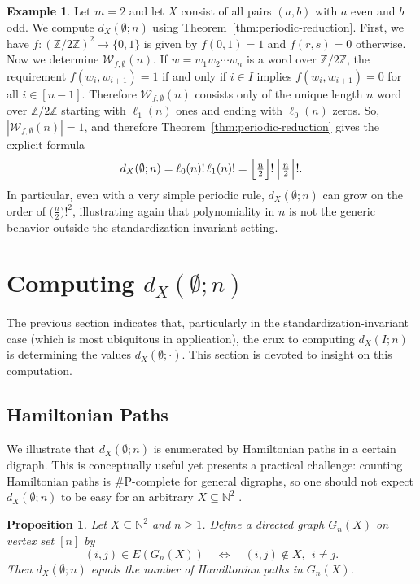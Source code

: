 \documentclass[12pt]{amsart}
\newtheorem{proposition}[theorem]{Proposition}
\theoremstyle{definition}
\newtheorem{example}[theorem]{Example}
\theoremstyle{remark}
\newcommand{\N}{\mathbb{N}}
\newcommand{\abs}[1]{\left|#1\right|}
\begin{document}
\begin{example} Let $m=2$ and let $X$ consist of all pairs $(a,b)$ with $a$ even and $b$ odd. We compute $d_X(\emptyset;n)$ using Theorem~\ref{thm:periodic-reduction}. First, we have $f:(\mathbb{Z}/2\mathbb{Z})^2 \to \{0,1\}$ is given by $f(0,1)=1$ and $f(r,s)=0$ otherwise. Now we determine $\mathcal{W}_{f,\emptyset}(n)$. If $w=w_1w_2 \cdots w_n$ is a word over $\mathbb{Z}/2\mathbb{Z}$, the requirement $f(w_i,w_{i+1})=1$ if and only if $i \in I$ implies $f(w_i,w_{i+1})=0$ for all $i \in [n-1]$. Therefore $\mathcal{W}_{f,\emptyset}(n)$ consists only of the unique length $n$ word over $\mathbb{Z}/2\mathbb{Z}$ starting with $\ell_1(n)$ ones and ending with $\ell_0(n)$ zeros. So, $\abs{\mathcal{W}_{f,\emptyset}(n)}=1$, and therefore Theorem~\ref{thm:periodic-reduction} gives the explicit formula
\[
d_X(\emptyset;n)=\ell_0(n)!\,\ell_1(n)! = \Bigl\lfloor\tfrac{n}{2}\Bigr\rfloor!\,\Bigl\lceil\tfrac{n}{2}\Bigr\rceil!.
\]
In particular, even with a very simple periodic rule, $d_X(\emptyset;n)$ can grow on the order of
$\bigl(\tfrac{n}{2}\bigr)!^2$, illustrating again that polynomiality in $n$ is not the generic behavior outside the
standardization-invariant setting.
\end{example}


\section{Computing $d_X(\emptyset;n)$}\label{sec:compute}

The previous section indicates that, particularly in the standardization-invariant case (which is most ubiquitous in application), the crux to computing $d_X(I;n)$ is determining the values $d_X(\emptyset;\cdot)$. This section is devoted to insight on this computation.

\subsection{Hamiltonian Paths}\label{sec:hamps}
%

 We illustrate that $d_X(\emptyset;n)$ is enumerated by Hamiltonian paths in a certain digraph. This is conceptually useful yet presents a practical challenge: counting Hamiltonian paths is \#P-complete for general digraphs, so one should not expect $d_X(\emptyset;n)$
to be easy for an arbitrary $X \subseteq \mathbb{N}^2$ \cite{garey-johnson,bang-jensen-gutin-digraphs}.

\begin{proposition}\label{prop:recursion}
Let $X\subseteq\N^2$ and $n\ge 1$. Define a directed graph $G_n(X)$ on vertex set $[n]$ by
\[
(i,j)\in E(G_n(X))\quad\Longleftrightarrow\quad (i,j)\notin X,\ \ i\neq j.
\]
Then $d_X(\emptyset;n)$ equals the number of Hamiltonian paths in $G_n(X)$.
\end{proposition}
\end{document}

